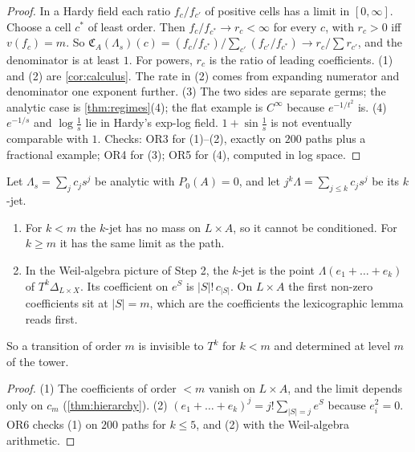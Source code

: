 \documentclass[11pt]{article}
\theoremstyle{definition}\newtheorem{definition}[theorem]{Definition}\newtheorem{remark}[theorem]{Remark}\newtheorem{example}[theorem]{Example}
\begin{document}
\begin{proof}
In a Hardy field each ratio $f_c/f_{c'}$ of positive cells has a limit in $[0,\infty]$. Choose a cell $c^*$ of least order. Then $f_c/f_{c^*}\to r_c<\infty$ for
every $c$, with $r_c>0$ iff $v(f_c)=m$. So $\mathfrak C_A(\Lambda_s)(c)=(f_c/f_{c^*})/\sum_{c'}(f_{c'}/f_{c^*})\to r_c/\sum r_{c'}$, and the denominator is at least $1$.
For powers, $r_c$ is the ratio of leading coefficients. (1) and (2) are \cref{cor:calculus}. The rate in (2) comes from expanding numerator
and denominator one exponent further. (3) The two sides are separate germs; the analytic case is \cref{thm:regimes}(4); the flat example
is $C^\infty$ because $e^{-1/t^2}$ is. (4) $e^{-1/s}$ and $\log\tfrac1s$ lie in Hardy's exp-log field. $1+\sin\tfrac1s$ is not eventually comparable
with $1$. Checks: OR3 for (1)--(2), exactly on $200$ paths plus a fractional example; OR4 for (3); OR5 for (4), computed in log space.
\end{proof}

\begin{proposition}\label{prop:tower}
Let $\Lambda_s=\sum_jc_js^j$ be analytic with $P_0(A)=0$, and let $j^k\Lambda=\sum_{j\le k}c_js^j$ be its $k$-jet.
\begin{enumerate}
\item[(1)] For $k<m$ the $k$-jet has no mass on $L\times A$, so it cannot be conditioned. For $k\ge m$ it has the same limit as the path.
\item[(2)] In the Weil-algebra picture of Step 2, the $k$-jet is the point $\Lambda(e_1+\dots+e_k)$ of $T^k\Delta_{L\times X}$. Its coefficient on $e^S$
  is $|S|!\,c_{|S|}$. On $L\times A$ the first non-zero coefficients sit at $|S|=m$, which are the coefficients the lexicographic lemma reads first.
\end{enumerate}
So a transition of order $m$ is invisible to $T^k$ for $k<m$ and determined at level $m$ of the tower.
\end{proposition}

\begin{proof}
(1) The coefficients of order $<m$ vanish on $L\times A$, and the limit depends only on $c_m$ (\cref{thm:hierarchy}). (2)
$(e_1+\dots+e_k)^j=j!\sum_{|S|=j}e^S$ because $e_i^2=0$. OR6 checks (1) on $200$ paths for $k\le5$, and (2) with the Weil-algebra arithmetic.
\end{proof}
\end{document}
